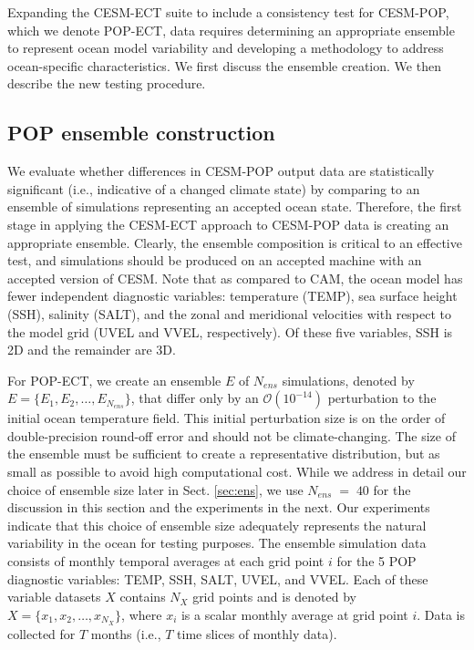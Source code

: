\documentclass[gmd, manuscript]{copernicus}
\begin{document}
Expanding the CESM-ECT suite to include a consistency test for CESM-POP, which we denote POP-ECT, data requires determining an appropriate ensemble to represent ocean model variability and developing a methodology to address ocean-specific characteristics. We first discuss the ensemble creation. We then describe the new testing procedure.

\subsection{POP ensemble construction}\label{sec:ensemble}

We evaluate whether differences in CESM-POP output data are statistically significant (i.e., indicative of a changed climate state) by comparing to an ensemble of simulations representing an accepted ocean state.  Therefore, the first stage in applying the CESM-ECT approach to CESM-POP data is creating an appropriate ensemble. Clearly, the ensemble composition is critical to an effective test, and simulations should be produced on an accepted machine with an accepted version of CESM.  Note that as compared to CAM, the ocean model has fewer independent diagnostic variables: temperature (TEMP), sea surface height (SSH), salinity (SALT), and the zonal and meridional velocities with respect to the model grid (UVEL and VVEL, respectively).  Of these five variables, SSH is 2D and the remainder are 3D.

For POP-ECT, we create an ensemble $E$ of $N_{ens}$ simulations, denoted by $E =\{E_1, E_2, \dots, E_{N_{ens}} \}$, that differ only by an $\mathcal{O}(10^{-14})$ perturbation to the initial ocean temperature field.  This initial perturbation size is on the order of double-precision round-off error and should not be climate-changing.
The size of the ensemble must be sufficient to create a representative distribution, but as small as possible to avoid high computational cost.  While we address in detail our choice of ensemble size later in Sect. \ref{sec:ens}, we use $N_{ens} \;=\; 40$ for the discussion in this section and the experiments in the next.  Our experiments indicate that this choice of ensemble size adequately represents the natural variability in the ocean for testing purposes.  The ensemble simulation data consists of monthly temporal averages at each grid point $i$ for the 5 POP diagnostic variables: TEMP, SSH, SALT, UVEL, and VVEL.  Each of these variable datasets $X$ contains $N_X$ grid points and is denoted by ${X} = \{ x_1, x_2, \dots, x_{N_X}\}$, where $x_i$ is a scalar monthly average at grid point $i$.  Data is collected for $T$ months (i.e., $T$ time slices of monthly data).
\end{document}
